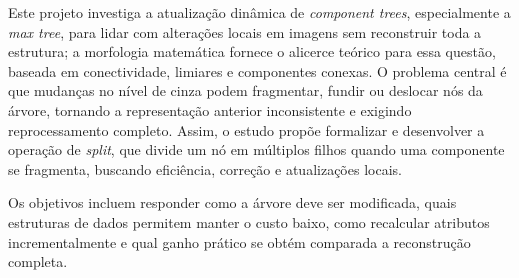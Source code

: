 Este projeto investiga a atualização dinâmica de \textit{component trees}, 
especialmente a \textit{max tree}, para lidar com alterações
locais em imagens sem reconstruir toda a estrutura; 
a morfologia matemática fornece o alicerce teórico para essa
questão, baseada em conectividade, limiares e componentes
conexas. O problema central é que mudanças no nível de cinza 
podem fragmentar, fundir ou deslocar nós da árvore, tornando 
a representação anterior inconsistente e exigindo reprocessamento 
completo. Assim, o estudo propõe formalizar e desenvolver 
a operação de \textit{split}, que divide um nó em 
múltiplos filhos quando uma componente se fragmenta, 
buscando eficiência, correção e atualizações locais. 
 
Os objetivos incluem responder como a árvore deve ser 
modificada, quais estruturas de dados permitem manter o 
custo baixo, como recalcular atributos incrementalmente e 
qual ganho prático se obtém comparada a reconstrução completa.